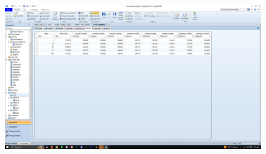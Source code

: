 \documentclass{article}
\begin{document}
\begin{figure}[H]
    \centering
    \includegraphics[width=0.99\textwidth, frame]{img/16 (generic).JPG}
\end{figure}
\end{document}
